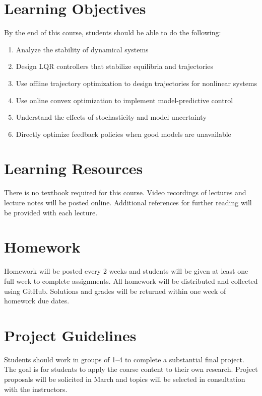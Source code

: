 \documentclass[11pt,letterpaper]{article}
\begin{document}
\section*{Learning Objectives}
By the end of this course, students should be able to do the following:
\begin{enumerate}
	\item Analyze the stability of dynamical systems
	\item Design LQR controllers that stabilize equilibria and trajectories
	\item Use offline trajectory optimization to design trajectories for nonlinear systems
	\item Use online convex optimization to implement model-predictive control
	\item Understand the effects of stochasticity and model uncertainty
	\item Directly optimize feedback policies when good models are unavailable
	
\end{enumerate}

\section*{Learning Resources}

There is no textbook required for this course. Video recordings of lectures and lecture notes will be posted online. Additional references for further reading will be provided with each lecture.

\section*{Homework}

Homework will be posted every 2 weeks and students will be given at least one full week to complete assignments. All homework will be distributed and collected using GitHub. Solutions and grades will be returned within one week of homework due dates.

\section*{Project Guidelines}

Students should work in groups of 1--4 to complete a substantial final project. The goal is for students to apply the coarse content to their own research. Project proposals will be solicited in March and topics will be selected in consultation with the instructors.
\end{document}
